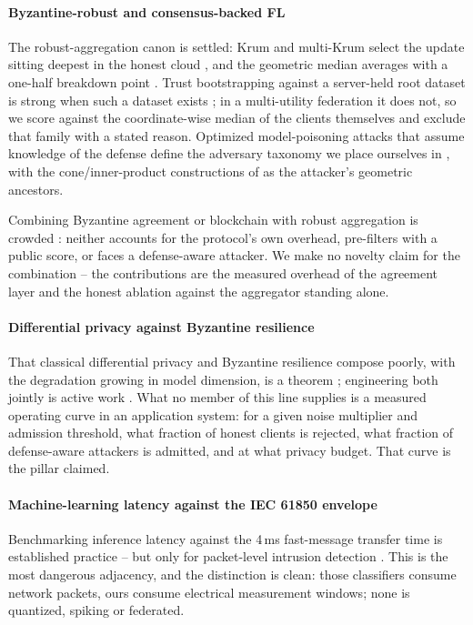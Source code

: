 \documentclass[review,12pt]{elsarticle}
\begin{document}
\paragraph{Byzantine-robust and consensus-backed FL}
The robust-aggregation canon is settled: Krum and multi-Krum select the
update sitting deepest in the honest cloud \cite{blanchard2017}, and the
geometric median averages with a one-half breakdown point
\cite{pillutla2022}. Trust bootstrapping against a server-held root
dataset is strong when such a dataset exists \cite{cao2021fltrust}; in a
multi-utility federation it does not, so we score against the
coordinate-wise median of the clients themselves and exclude that family
with a stated reason. Optimized model-poisoning attacks that assume
knowledge of the defense define the adversary taxonomy we place
ourselves in \cite{fang2020,shejwalkar2021}, with the cone/inner-product
constructions of \cite{baruch2019,xie2019} as the attacker's geometric
ancestors.

Combining Byzantine agreement or blockchain with robust aggregation is
crowded \cite{kfc2025,li2024brfl}: neither accounts for the protocol's
own overhead, pre-filters with a public score, or faces a defense-aware
attacker. We make no novelty claim for the combination -- the
contributions are the measured overhead of the agreement layer and the
honest ablation against the aggregator standing alone.

\paragraph{Differential privacy against Byzantine resilience}
That classical differential privacy and Byzantine resilience compose
poorly, with the degradation growing in model dimension, is a theorem
\cite{guerraoui2021podc,guerraoui2021combining}; engineering both jointly
is active work \cite{gu2024dpbrem,gu2021precad}. What no member of this
line supplies is a measured operating curve in an application system:
for a given noise multiplier and admission threshold, what fraction of
honest clients is rejected, what fraction of defense-aware attackers is
admitted, and at what privacy budget. That curve is the pillar claimed.

\paragraph{Machine-learning latency against the IEC 61850 envelope}
Benchmarking inference latency against the 4\,ms fast-message transfer
time is established practice -- but only for packet-level intrusion
detection \cite{ustun2021,moore2026}. This is the most dangerous
adjacency, and the distinction is clean: those classifiers consume
network packets, ours consume electrical measurement windows; none is
quantized, spiking or federated.
\end{document}
